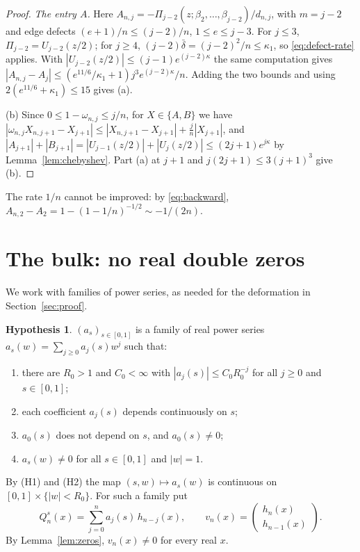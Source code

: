 \documentclass[11pt]{amsart}
\theoremstyle{definition}
\newtheorem{hypothesis}[theorem]{Hypothesis}
\theoremstyle{remark}
\numberwithin{equation}{section}
\begin{document}
\begin{proof}
\emph{The entry $A$.} Here $A_{n,j}=-\Pi_{j-2}(z;\beta_2,\dots,\beta_{j-2})/d_{n,j}$, with $m=j-2$ and edge defects $(e+1)/n\le(j-2)/n$, $1\le e\le j-3$. For $j\le3$, $\Pi_{j-2}=U_{j-2}(z/2)$; for $j\ge4$, $(j-2)\bar\delta=(j-2)^2/n\le\kappa_1$, so \eqref{eq:defect-rate} applies. With $|U_{j-2}(z/2)|\le(j-1)e^{(j-2)\kappa}$ the same computation gives $|A_{n,j}-A_j|\le(e^{11/6}/\kappa_1+1)j^3e^{(j-2)\kappa}/n$. Adding the two bounds and using $2(e^{11/6}+\kappa_1)\le15$ gives (a).

(b) Since $0\le1-\omega_{n,j}\le j/n$, for $X\in\{A,B\}$ we have $|\omega_{n,j}X_{n,j+1}-X_{j+1}|\le|X_{n,j+1}-X_{j+1}|+\frac jn|X_{j+1}|$, and $|A_{j+1}|+|B_{j+1}|=|U_{j-1}(z/2)|+|U_j(z/2)|\le(2j+1)e^{j\kappa}$ by Lemma~\ref{lem:chebyshev}. Part (a) at $j+1$ and $j(2j+1)\le3(j+1)^3$ give (b).
\end{proof}

The rate $1/n$ cannot be improved: by \eqref{eq:backward}, $A_{n,2}-A_2=1-(1-1/n)^{-1/2}\sim-1/(2n)$.

\section{The bulk: no real double zeros}\label{sec:bulk}

We work with families of power series, as needed for the deformation in Section~\ref{sec:proof}.

\begin{hypothesis}\label{hyp:H}
$(a_s)_{s\in[0,1]}$ is a family of real power series $a_s(w)=\sum_{j\ge0}a_j(s)w^j$ such that:
\begin{enumerate}
\item[(H1)] there are $R_0>1$ and $C_0<\infty$ with $|a_j(s)|\le C_0R_0^{-j}$ for all $j\ge0$ and $s\in[0,1]$;
\item[(H2)] each coefficient $a_j(s)$ depends continuously on $s$;
\item[(H3)] $a_0(s)$ does not depend on $s$, and $a_0(s)\neq0$;
\item[(H4)] $a_s(w)\neq0$ for all $s\in[0,1]$ and $|w|=1$.
\end{enumerate}
\end{hypothesis}

By (H1) and (H2) the map $(s,w)\mapsto a_s(w)$ is continuous on $[0,1]\times\{|w|<R_0\}$. For such a family put
\[
Q_n^{s}(x)=\sum_{j=0}^{n}a_j(s)\,h_{n-j}(x),\qquad v_n(x)=\begin{pmatrix}h_n(x)\\h_{n-1}(x)\end{pmatrix}.
\]
By Lemma~\ref{lem:zeros}, $v_n(x)\neq0$ for every real $x$.
\end{document}
